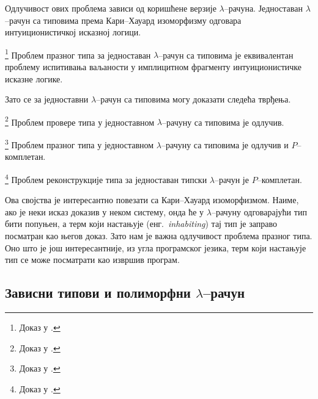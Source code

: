 Одлучивост ових проблема зависи од коришћене верзије
$\lambda$--рачуна. Једноставан $\lambda$--рачун са типовима према
Кари--Хауард изоморфизму одговара интуиционистичкој исказној логици.

\begin{theorem} \footnote{Доказ у \cite{barendregt2013lambda}.} 
Проблем празног типа за једноставан $\lambda$--рачун са типовима је
еквивалентан проблему испитивања ваљаности у имплицитном фрагменту
интуиционистичке исказне логике.
\end{theorem}

Зато се за једноставни $\lambda$--рачун са типовима могу доказати
следећа тврђења.

\begin{theorem} \footnote{Доказ у \cite{barendregt2013lambda}.} 
Проблем провере типа у једноставном $\lambda$--рачуну са типовима је
одлучив.
\end{theorem}

\begin{theorem} \footnote{Доказ у \cite{barendregt2013lambda}.} 
Проблем празног типа у једноставном $\lambda$--рачуну са типовима је
одлучив и $P$--комплетан.
\end{theorem}

\begin{theorem} \footnote{Доказ у \cite{barendregt2013lambda}.} 
Проблем реконструкције типа за једноставан типски $\lambda$--рачун је
$P$--комплетан.
\end{theorem}


Ова својства је интересантно повезати са Кари--Хауард
изоморфизмом. Наиме, ако је неки исказ доказив у неком систему, онда
ће у $\lambda$--рачуну одговарајући тип бити попуњен, а терм који
настањује (енг.~\emph{inhabiting}) тај тип је заправо посматран као његов
доказ. Зато нам је важна одлучивост проблема празног типа. Оно што је
још интересантније, из угла програмског језика, терм који настањује
тип се може посматрати као извршив програм.

\subsection{Зависни типови и полиморфни $\lambda$--рачун}

